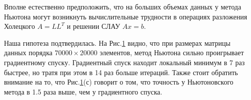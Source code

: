 \documentclass{article}
\begin{document}
	Вполне естественно предположить, что на больших объемах данных у метода Ньютона могут возникнуть вычислительные трудности в операциях разложения Холецкого $A = L L^T$ и решении СЛАУ $Ax = b$.
	
	\begin{figure}[H]
		\centering
		\hfill %
		\hfill %
		\caption{}
		\label{fig:real-sim}
	\end{figure}
	
	Наша гипотеза подтвердилась. На Рис.\ref{fig:real-sim} видно, что при размерах матрицы данных порядка $70000 \times 20000$ элементов, метод Ньютона сильно проигрывает градиентному спуску. Градиентный спуск находит локальный минимум в 7 раз быстрее, но тратя при этом в 14 раз больше итераций. Также стоит обратить внимание на то, что Рис.\ref{fig:real-sim}(с) говорит о том, что точность у Ньютоновского метода в 1.5 раза выше, чем у градиентного спуска.
	
\end{document}
